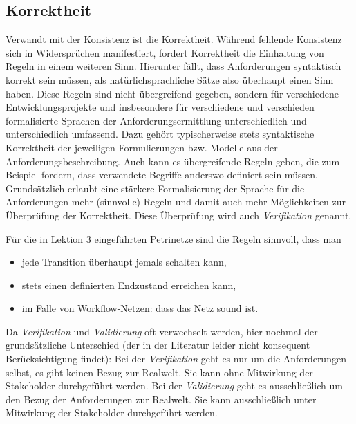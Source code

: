 \subsection{Korrektheit}
\label{sec:Kap-6.4.3}

\vspace{-1mm} %

Verwandt mit der Konsistenz ist die Korrektheit. Während fehlende Konsistenz sich in Widersprüchen manifestiert, fordert Korrektheit die Einhaltung von Regeln in einem weiteren Sinn. Hierunter fällt, dass Anforderungen syntaktisch korrekt sein müssen, als natürlichsprachliche Sätze also überhaupt einen Sinn haben. Diese Regeln sind nicht übergreifend gegeben, sondern für verschiedene Entwicklungsprojekte und insbesondere für verschiedene und verschieden formalisierte Sprachen der Anforderungsermittlung unterschiedlich und unterschiedlich umfassend. Dazu gehört typischer\-weise stets syntaktische Korrektheit der jeweiligen Formulierungen bzw. Modelle aus der Anforderungsbeschreibung. Auch kann es übergreifende Regeln geben, die zum Beispiel fordern, dass verwendete Begriffe anderswo definiert sein müssen. Grundsätzlich erlaubt eine stärkere Formalisierung der Sprache für die Anforderungen mehr (sinnvolle) Regeln und damit auch mehr Möglichkeiten zur Überprüfung der Korrektheit. Diese Überprüfung wird auch \textit{Verifikation} genannt.

Für die in Lektion 3 eingeführten Petrinetze sind \zb die Regeln sinnvoll, dass man
\begin{itemize}
	\item jede Transition überhaupt jemals schalten kann, 
	\item stets einen definierten Endzustand erreichen kann,
	\item im Falle von Workflow-Netzen: dass das Netz sound ist.
\end{itemize}

Da \textit{Verifikation} und \textit{Validierung} oft verwechselt werden, hier nochmal der grundsätzliche Unterschied (der in der Literatur leider nicht konsequent Berücksichtigung findet): Bei der \textit{Verifikation} geht es nur um die Anforderungen selbst, es gibt keinen Bezug zur Realwelt. Sie kann ohne Mitwirkung der Stakeholder durchgeführt werden. Bei der \textit{Validierung} geht es ausschließlich um den Bezug der Anforderungen zur Realwelt. Sie kann ausschließlich unter Mitwirkung der Stakeholder durchgeführt werden.